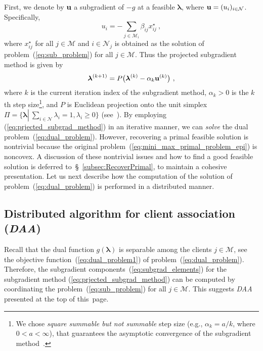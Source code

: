 \documentclass[journal, 10pt, twocolumn]{IEEEtran}
\newcommand{\be}{\begin{equation}}
\newcommand{\ee}{\end{equation}}
\renewcommand{\vec}[1]{\bf{#1}}     \newcommand{\vecsc}[1]{\mbox {\boldmath \scriptsize $#1$}}     \newcommand{\itvec}[1]{\mbox {\boldmath $#1$}}
\begin{document}
First, we denote by $\vec u$ a subgradient of $-g$ at a feasible $\boldsymbol{\lambda}$, where ${\vec u}=(u_i)_{i\in\mathcal{N}}$.
Specifically,
\be\label{eq:subgrad_elements}
\textstyle u_i = -\sum_{j\in\mathcal{M}_i}\beta_{ij}x^\star_{ij} \ ,
\ee
where $x^\star_{ij}$ for all $j\in\mathcal{M}$ and $i\in\mathcal{N}_j$ is obtained as the solution of problem~(\ref{eq:sub_problem}) for all $j\in\mathcal{M}$. Thus the projected subgradient method is given by
\be\label{eq:prjected_subgrad_method}
\boldsymbol{\lambda}^{(k+1)} =  P\big(\boldsymbol{\lambda}^{(k)} - \alpha_k {\vec u}^{(k)}\big) \ ,
\ee
where $k$ is the current iteration index of the subgradient method, $\alpha_k>0$ is the $k$th step size\footnote{We chose \emph{square summable but not summable} step size (e.g., $\alpha_k=a/k$, where $0< a<\infty$), that guarantees the asymptotic convergence of the subgradient method~\cite{Boyd-EE364b-SubGradMethods-07}.}, and $P$ is Euclidean projection onto the unit simplex $\Pi=\{\boldsymbol{\lambda} \left| \ \sum_{i \in \mathcal{N}} \lambda_{i}=1, \lambda_i\geq0 \right.\}$ (see~\cite[Excercise~2.1.12]{Bertsekas-99}). By employing (\ref{eq:prjected_subgrad_method}) in an iterative manner, we can \emph{solve} the dual problem~(\ref{eq:dual_problem}). However, recovering a primal feasible solution is nontrivial because the original problem~(\ref{eq:mini_max_primal_problem_epi}) is noncovex. A discussion of these nontrivial issues and how to find a good feasible solution is deferred to~\S~\ref{subsec:RecoverPrimal}, to maintain a cohesive presentation. Let us next describe how the computation of the solution of problem~(\ref{eq:dual_problem}) is performed in a distributed manner.




\subsection{Distributed algorithm for client association (\emph{DAA})}\label{subsec:distributed_alg}
Recall that the dual function $g(\boldsymbol\lambda)$ is separable among the clients $j\in\mathcal{M}$, see the objective function~(\ref{eq:dual_problem1}) of problem~(\ref{eq:dual_problem}). Therefore, the subgradient components~(\ref{eq:subgrad_elements}) for the subgradient method (\ref{eq:prjected_subgrad_method}) can be computed by coordinating the problem~(\ref{eq:sub_problem}) for all $j\in\mathcal{M}$. This suggests \emph{DAA} presented at the top of this~page.
\end{document}

